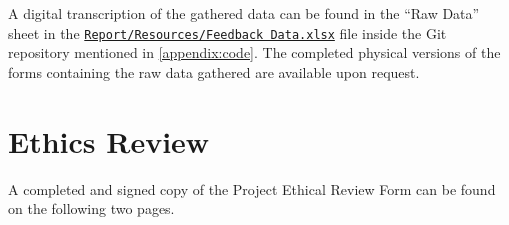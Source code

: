 		A digital transcription of the gathered data can be found in the \enquote{Raw Data} sheet in the \href{https://github.com/nboxhallburnett/IndividualProject/blob/master/Report/Resources/Feedback\%20Data.xlsx?raw=true}{\texttt{Report/Resources/Feedback Data.xlsx}} file inside the Git repository mentioned in \autoref{appendix:code}.
		The completed physical versions of the forms containing the raw data gathered are available upon request.

		

	\section{Ethics Review}
	\label{appendix:ethics}
		A completed and signed copy of the Project Ethical Review Form can be found on the following two pages.

		
